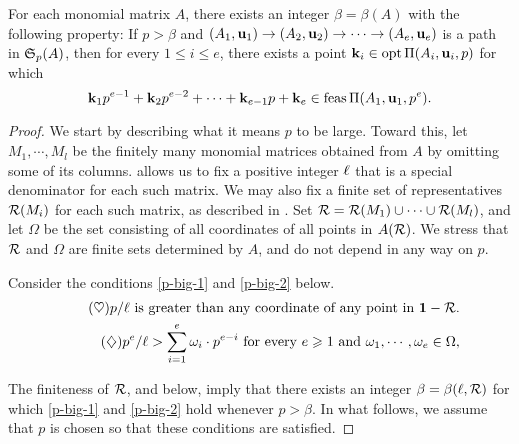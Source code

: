 \documentclass[11pt]{amsart}
\begin{document}
\begin{theorem}
\label{ILL: T}
   For each monomial matrix $A$, there exists an integer $\beta = \beta(A)$ with the following property\textup:
   If $p>\beta$ and $(A_1, \mathbf{u}_1) \to (A_2, \mathbf{u}_2) \to \cdots \to (A_e, \mathbf{u}_e)$ is a path in $\mathfrak{S}_p(A)$, then for every $1 \leq i \leq e$, there exists a point $\mathbf{k}_i \in \operatorname{opt} \Pi(A_i, \mathbf{u}_i,p)$  for which
 \[
  \mathbf{k}_1 p^{e-1} + \mathbf{k}_2 p^{e-2} + \cdots + \mathbf{k}_{e-1} p + \mathbf{k}_e \in \operatorname{feas} \Pi(A_1, \mathbf{u}_1, p^e).
 \] 
\end{theorem}

\begin{proof}  We start by describing what it means $p$ to be large.  Toward this, let $M_1, \cdots, M_l$ be the finitely many monomial matrices obtained from $A$ by omitting some of its columns.   allows us to fix a positive integer $\ell$ that is a special denominator for each such matrix.  We may also fix a finite set of representatives $\mathcal{R}(M_i)$ for each such matrix, as described in .  Set $\mathcal{R} = \mathcal{R}(M_1) \cup \cdots \cup \mathcal{R}(M_l)$, and let $\Omega$ be the set consisting of all coordinates of all points in $A(\mathcal{R})$.  We stress that $\mathcal{R}$ and $\Omega$ are finite sets determined by $A$, and do not depend in any way on $p$.

Consider the conditions \eqref{p-big-1} and \eqref{p-big-2} below.
%
\begin{align}
\tag{$\heartsuit$} \label{p-big-1}
\text{$p/\ell$ is greater than any coordinate of any point in $\mathbf{1} - \mathcal{R}$.} \\
 \label{p-big-2}
\tag{$\diamondsuit$}\text{$p^e / \ell > \sum_{i=1}^e \omega_i \cdot p^{e-i}$ for every $e \geqslant 1$ and $\omega_1, \cdots, \omega_e \in \Omega$,}
\end{align}

The finiteness of $\mathcal{R}$,  and  below, imply that there exists an integer $\beta = \beta(\ell, \mathcal{R})$ for which \eqref{p-big-1} and \eqref{p-big-2} hold whenever $p > \beta$.  In what follows, we assume that $p$ is chosen so that these conditions are satisfied.


\end{proof}
\end{document}
